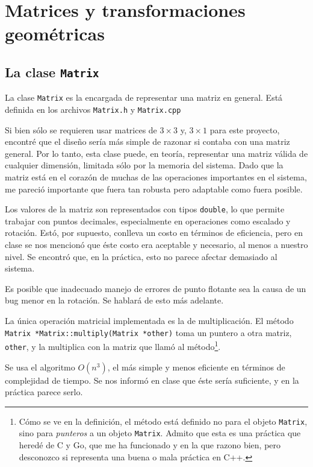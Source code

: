 \section{Matrices y transformaciones geométricas}
\label{matrices_transformaciones}

\subsection{La clase \lstinline{Matrix}}

La clase \lstinline!Matrix! es la encargada de representar una matriz en general.
Está definida en los archivos \lstinline!Matrix.h! y \lstinline!Matrix.cpp!

Si bien sólo se requieren usar matrices de $3\times3$ y, $3\times1$ para este proyecto,
encontré que el diseño sería más simple de razonar si contaba con una matriz general.
Por lo tanto, esta clase puede, en teoría, representar una matriz válida de cualquier
dimensión, limitada sólo por la memoria del sistema. Dado que la matriz está en el
corazón de muchas de las operaciones importantes en el sistema, me pareció importante
que fuera tan robusta pero adaptable como fuera posible.

Los valores de la matriz son representados con tipos \lstinline!double!, lo que permite
trabajar con puntos decimales, especialmente en operaciones como escalado y rotación.
Estó, por supuesto, conlleva un costo en términos de eficiencia, pero en clase se nos
mencionó que éste costo era aceptable y necesario, al menos a nuestro nivel. Se encontró
que, en la práctica, esto no parece afectar demasiado al sistema.

Es posible que inadecuado manejo de errores de punto flotante sea la causa de un bug
menor en la rotación. Se hablará de esto más adelante.

La única operación matricial implementada es la de multiplicación. El método
\lstinline!Matrix *Matrix::multiply(Matrix *other)! toma un puntero a otra matriz,
\lstinline!other!, y la multiplica con la matriz que llamó al método\footnote{Cómo
se ve en la definición, el método está definido no para el objeto \lstinline!Matrix!,
sino para \emph{punteros} a un objeto \lstinline!Matrix!. Admito que esta es una práctica
que heredé de C y Go, que me ha funcionado y en la que razono bien, pero desconozco si
representa una buena o mala práctica en C++.}.

Se usa el algoritmo $O(n^3)$, el más simple y menos eficiente en términos de complejidad de tiempo.
Se nos informó en clase que éste sería suficiente, y en la práctica parece serlo.

